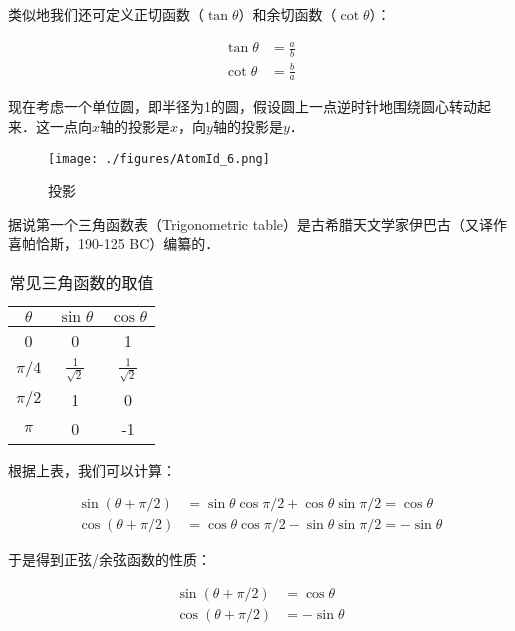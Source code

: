 类似地我们还可定义正切函数（$\tan \theta$）和余切函数（$\cot \theta$）：

\begin{equation}
\begin{aligned}
\tan \theta & = \frac{a}{b} \\
\cot \theta & = \frac{b}{a}
\end{aligned}
\end{equation}

现在考虑一个单位圆，即半径为1的圆，假设圆上一点逆时针地围绕圆心转动起来．这一点向$x$轴的投影是$x$，向$y$轴的投影是$y$．

\begin{figure}[ht]
\centering
\texttt{[image: ./figures/AtomId\_6.png]}
\caption{投影} \label{AtomId_fig6}
\end{figure}

据说第一个三角函数表（Trigonometric table）是古希腊天文学家伊巴古（又译作喜帕恰斯，190-125 BC）编纂的．

\begin{table}[ht]
\centering
\caption{常见三角函数的取值}\label{AtomId_tab2}
\begin{tabular}{|c|c|c|}
\hline
$\theta$ & $\sin \theta$ &  $\cos \theta$ \\
\hline
0  &  0 &  1 \\
\hline
$\pi/4$ & $\frac{1}{\sqrt 2}$  & $\frac{1}{\sqrt 2}$ \\
\hline
$\pi/2$ & 1  &  0 \\
\hline
$\pi$ & 0 & -1 \\
\hline
\end{tabular}
\end{table}

根据上表，我们可以计算：

\begin{equation}
\begin{aligned}
\sin ( \theta + \pi /2) & = \sin \theta \cos \pi /2 + \cos \theta  \sin \pi/2 = \cos \theta \\
\cos ( \theta + \pi /2) & = \cos  \theta \cos \pi /2 - \sin \theta \sin \pi/2 = - \sin \theta
\end{aligned}
\end{equation}

于是得到正弦/余弦函数的性质：

\begin{equation}
\begin{aligned}
\sin ( \theta + \pi /2 ) & = \cos \theta \\
\cos ( \theta + \pi /2) & = - \sin \theta
\end{aligned}
\end{equation}

